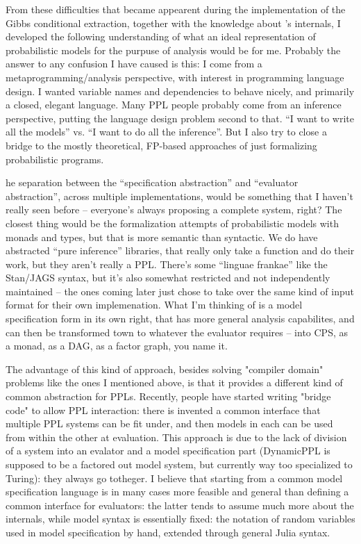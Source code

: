 From these difficulties that became appearent during the implementation of the Gibbs conditional
extraction, together with the knowledge about \dppljl{}'s internals, I developed the following
understanding of what an ideal representation of probabilistic models for the purpuse of analysis
would be for me. Probably the answer to any confusion I have caused is this: I come from a
metaprogramming/analysis perspective, with interest in programming language design. I wanted
variable names and dependencies to behave nicely, and primarily a closed, elegant language. Many PPL
people probably come from an inference perspective, putting the language design problem second to
that. “I want to write all the models” vs. “I want to do all the inference”. But I also try to close
a bridge to the mostly theoretical, FP-based approaches of just formalizing probabilistic programs.

he separation between the “specification abstraction” and “evaluator abstraction”, across multiple
implementations, would be something that I haven’t really seen before – everyone’s always proposing
a complete system, right? The closest thing would be the formalization attempts of probabilistic
models with monads and types, but that is more semantic than syntactic. We do have abstracted “pure
inference” libraries, that really only take a function and do their work, but they aren’t really a
PPL. There’s some “linguae frankae” like the Stan/JAGS syntax, but it’s also somewhat restricted and
not independently maintained – the ones coming later just chose to take over the same kind of input
format for their own implemenation. What I’m thinking of is a model specification form in its own
right, that has more general analysis capabilites, and can then be transformed town to whatever the
evaluator requires – into CPS, as a monad, as a DAG, as a factor graph, you name it.

The advantage of this kind of approach, besides solving "compiler domain" problems like the ones I
mentioned above, is that it provides a different kind of common abstraction for PPLs. Recently,
people have started writing "bridge code" to allow PPL interaction: there is invented a common
interface that multiple PPL systems can be fit under, and then models in each can be used from
within the other at evaluation. This approach is due to the lack of division of a system into an
evalator and a model specification part (DynamicPPL is supposed to be a factored out model system,
but currently way too specialized to Turing): they always go totheger. I believe that starting from
a common model specification language is in many cases more feasible and general than defining a
common interface for evaluators: the latter tends to assume much more about the internals, while
model syntax is essentially fixed: the notation of random variables used in model specification by
hand, extended through general Julia syntax.


